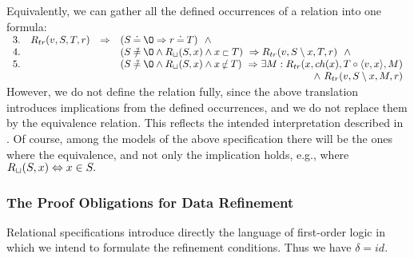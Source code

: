 \noindent
Equivalently, we can gather all the defined occurrences of a relation into one
formula:\\[1ex]
\(\begin{array}{rrcl}
3. & \Pre R{tr}(v,S,T,r) & \impl & (S\Eq \es \impl r\Eq T)\ \ \land \\ 
4. & & & (S\Not\Eq\es\land\Pre R\ch(S,x)\land x\lin T)\ \impl 
\Pre R{tr}(v,S\setminus x,T,r)\ \ \land \\ 
5. & & & (S\Not\Eq\es\land\Pre R\ch(S,x)\land x\Not\lin T)\ \impl 
\exists M: \Pre R{tr}(x,ch(x),T\ap\<v,x\>,M) \\ & \multicolumn{3}{r}{\land\ \Pre R{tr}(v,S\setminus x,M,r)} \end{array} \)\\[1ex]
\noindent However, we do not define the relation fully, since the above translation introduces implications from the defined occurrences, and we do not replace them by the equivalence relation. This reflects the intended
interpretation described in . Of course, among the models of
the above specification there will be the ones where the equivalence, and not
only the implication holds, e.g., where $R_{\sqcup}(S,x)\mathrel{\Leftrightarrow} x\in
S.$

\subsubsection{The Proof Obligations for Data Refinement} Relational specifications introduce directly the language of first-order logic in which we intend to formulate the refinement conditions. Thus we have $\delta = id$. 


